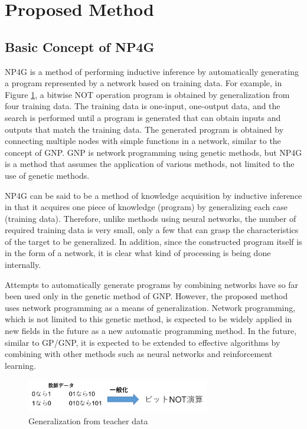 \documentclass{article}
\begin{document}
\section {Proposed Method}
\subsection{Basic Concept of NP4G}
NP4G is a method of performing inductive inference by automatically generating a program represented by a network based on training data.
For example, in Figure \ref{fig:summary}, a bitwise NOT operation program is obtained by generalization from four training data.
The training data is one-input, one-output data, and the search is performed until a program is generated that can obtain inputs and outputs that match the training data.
The generated program is obtained by connecting multiple nodes with simple functions in a network, similar to the concept of GNP.
GNP is network programming using genetic methods, but NP4G is a method that assumes the application of various methods, not limited to the use of genetic methods.

NP4G can be said to be a method of knowledge acquisition by inductive inference in that it acquires one piece of knowledge (program) by generalizing each case (training data).
Therefore, unlike methods using neural networks, the number of required training data is very small, only a few that can grasp the characteristics of the target to be generalized.
In addition, since the constructed program itself is in the form of a network, it is clear what kind of processing is being done internally.

Attempts to automatically generate programs by combining networks have so far been used only in the genetic method of GNP.
However, the proposed method uses network programming as a means of generalization.
Network programming, which is not limited to this genetic method, is expected to be widely applied in new fields in the future as a new automatic programming method.
In the future, similar to GP/GNP, it is expected to be extended to effective algorithms by combining with other methods such as neural networks and reinforcement learning.

\begin{figure}[t]
\begin{center}
\includegraphics[width=80mm]{summary.png}
\end{center}
\caption {Generalization from teacher data}
\label{fig:summary}
\end{figure}
\end{document}
